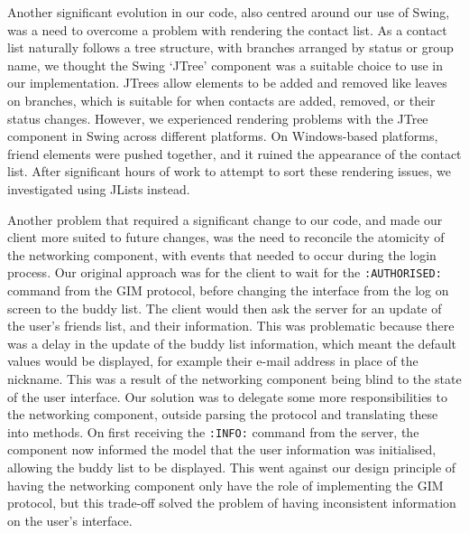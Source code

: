 Another significant evolution in our code, also centred around our use of Swing, was a need to overcome a problem with rendering the contact list. As a contact list naturally follows a tree structure, with branches arranged by status or group name, we thought the Swing `JTree' component was a suitable choice to use in our implementation. JTrees allow elements to be added and removed like leaves on branches, which is suitable for when contacts are added, removed, or their status changes. However, we experienced rendering problems with the JTree component in Swing across different platforms. On Windows-based platforms, friend elements were pushed together, and it ruined the appearance of the contact list. After significant hours of work to attempt to sort these rendering issues, we investigated using JLists instead. %

Another problem that required a significant change to our code, and made our client more suited to future changes, was the need to reconcile the atomicity of the networking component, with events that needed to occur during the login process. Our original approach was for the client to wait for the \texttt{:AUTHORISED:} command from the GIM protocol, before changing the interface from the log on screen to the buddy list. The client would then ask the server for an update of the user's friends list, and their information. This was problematic because there was a delay in the update of the buddy list information, which meant the default values would be displayed, for example their e-mail address in place of the nickname. This was a result of the networking component being blind to the state of the user interface. Our solution was to delegate some more responsibilities to the networking  component, outside parsing the protocol and translating these into methods. On first receiving the \texttt{:INFO:} command from the server, the component now informed the model that the user information was initialised, allowing the buddy list to be displayed. This went against our design principle of having the networking component only have the role of implementing the GIM protocol, but this trade-off solved the problem of having inconsistent information on the user's interface. 
